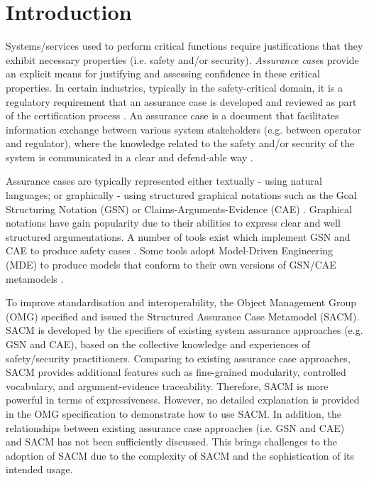 \section{Introduction}
Systems/services used to perform critical functions require justifications that they exhibit necessary properties (i.e. safety and/or security). 
\textit{Assurance case}s provide an explicit means for justifying and assessing confidence in these critical properties. 
In certain industries, typically in the safety-critical domain, it is a regulatory requirement that an assurance case is developed and reviewed as part of the certification process \cite{healthFound}.
An assurance case is a document that facilitates information exchange between various system stakeholders (e.g. between operator and regulator), where the knowledge related to the safety and/or security of the system is communicated in a clear and defend-able way \cite{hawkins2013assurance}. 

Assurance cases are typically represented either textually - using natural languages; or graphically - using structured graphical notations such as the Goal Structuring Notation (GSN) \cite{kelly2004goal} or Claims-Arguments-Evidence (CAE) \cite{bishop2000methodology}. 
Graphical notations have gain popularity due to their abilities to express clear and well structured argumentations.
A number of tools exist which implement GSN and CAE to produce safety cases \cite{maksimov2018}. 
Some tools adopt Model-Driven Engineering (MDE) to produce models that conform to their own versions of GSN/CAE metamodels \cite{denney2017tool, matsuno2010dependability, netkachova2014tool, larrucea2017supporting, barry2011certware}.

To improve standardisation and interoperability, the Object Management Group (OMG) specified and issued the Structured Assurance Case Metamodel (SACM). 
SACM is developed by the specifiers of existing system assurance approaches (e.g. GSN and CAE), based on the collective knowledge and experiences of safety/security practitioners.
Comparing to existing assurance case approaches, SACM provides additional features such as fine-grained modularity, controlled vocabulary, and argument-evidence traceability. 
Therefore, SACM is more powerful in terms of expressiveness. 
However, no detailed explanation is provided in the OMG specification to demonstrate how to use SACM. In addition, the relationships between existing assurance case approaches (i.e. GSN and CAE) and SACM has not been sufficiently discussed. 
This brings challenges to the adoption of SACM due to the complexity of SACM and the sophistication of its intended usage. 

